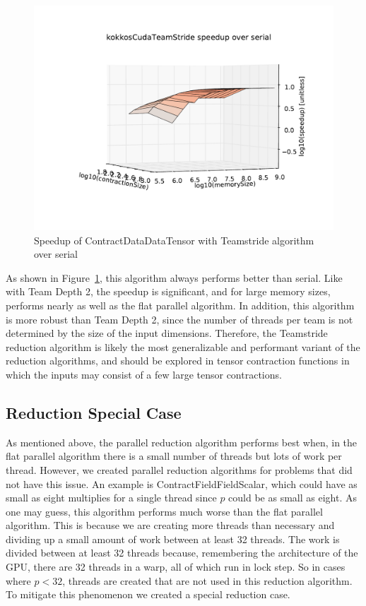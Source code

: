 \begin{figure}[ht]
    \includegraphics[scale=.55]{./VersusSerial_kokkosCudaTeamStride_clearCache_shadowfax.pdf}
\caption{Speedup of ContractDataDataTensor with Teamstride algorithm over
    serial
\label{fig:ContractDataDataTensorTeamstride}} 
\end{figure}

As shown in Figure~\ref{fig:ContractDataDataTensorTeamstride}, this algorithm
always performs better than serial.  Like with Team Depth 2, the speedup is
significant, and for large memory sizes, performs nearly as well as the flat
parallel algorithm.  In addition, this algorithm is more robust than Team Depth
2, since the number of threads per team is not determined by the size of the
input dimensions.  Therefore, the Teamstride reduction algorithm is likely the
most generalizable and performant variant of the reduction algorithms, and
should be explored in tensor contraction functions in which the inputs may
consist of a few large tensor contractions.

\subsection{Reduction Special Case}
As mentioned above, the parallel reduction algorithm performs best when, in the flat parallel algorithm there is a small number of threads but lots of work per thread. However, we created parallel reduction algorithms for problems that did not have this issue. An example is ContractFieldFieldScalar, which could have as small as eight multiplies for a single thread since $p$ could be as small as eight. As one may guess, this algorithm performs much worse than the flat parallel algorithm. This is because we are creating more threads than necessary and dividing up a small amount of work between at least 32 threads. The work is divided between at least 32 threads because, remembering the architecture of the GPU, there are 32 threads in a warp, all of which run in lock step. So in cases where $p < 32$, threads are created that are not used in this reduction algorithm. To mitigate this phenomenon we created a special reduction case.

